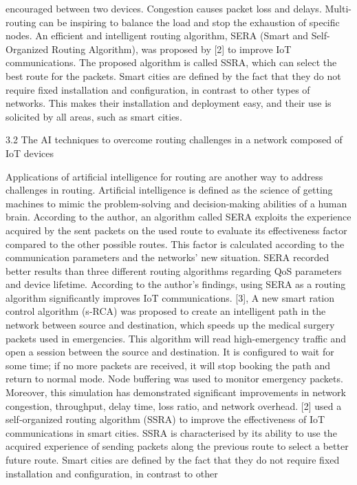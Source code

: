  encouraged between two devices. Congestion causes packet loss and delays. Multi-routing can be inspiring to balance the 
 load and stop the exhaustion of specific nodes. 
 An efficient and intelligent routing algorithm, SERA (Smart and Self-Organized Routing Algorithm), was proposed by [2] to 
 improve IoT communications. The proposed algorithm is called SSRA, which can select the best route for the packets. 
 Smart cities are defined by the fact that they do not require fixed installation and configuration, in contrast to other types
  of networks. This makes their installation and deployment easy, and their use is solicited by all areas, such as smart cities.
 
  3.2 The AI techniques to overcome routing challenges in a network composed of IoT devices 
  
Applications of artificial intelligence for routing are another way to address challenges in routing. Artificial intelligence
is defined as the science of getting machines to mimic the problem-solving and decision-making abilities of a human brain. 
According to the author, an algorithm called SERA exploits the experience acquired by the sent packets on the used route to 
evaluate its effectiveness factor compared to the other possible routes. This factor is calculated according to the 
communication parameters and the networks’ new situation. SERA recorded better results than three different routing
algorithms regarding QoS parameters and device lifetime. According to the author's findings, using SERA as a routing 
algorithm significantly improves IoT communications. [3], A new smart ration control algorithm (s-RCA) was proposed to 
create an intelligent path in the network between source and destination, which speeds up the medical surgery packets 
used in emergencies. This algorithm will read high-emergency traffic and open a session between the source and destination.
It is configured to wait for some time; if no more packets are received, it will stop booking the path and return to normal
 mode. Node buffering was used to monitor emergency packets. Moreover, this simulation has demonstrated significant 
improvements in network congestion, throughput, delay time, loss ratio, and network overhead. [2] used a self-organized 
routing algorithm (SSRA) to improve the effectiveness of IoT communications in smart cities. SSRA is characterised by its 
ability to use the acquired experience of sending packets along the previous route to select a better future route. 
Smart cities are defined by the fact that they do not require fixed installation and configuration, in contrast to other 
